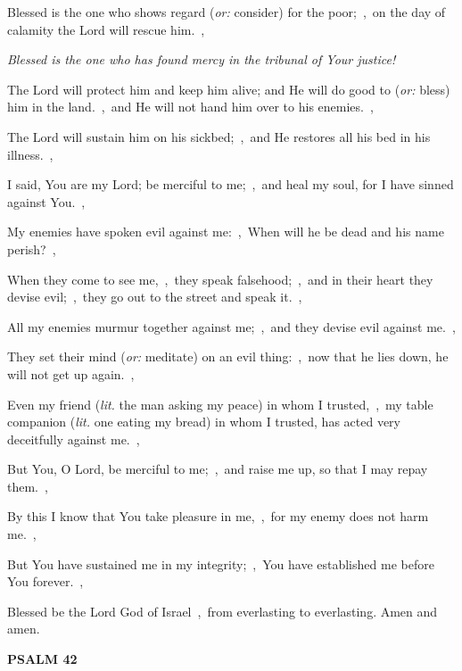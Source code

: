 \documentclass[12pt,twoside,a5paper]{article}
\newcommand{\psalm}[1]{\textbf{PSALM {#1}}\nopagebreak}
\newcommand{\qanona}[1]{{\liturgicalhint{Qanona.} \emph{#1}}}
\newcommand{\translationoption}[1]{\emph{or:} #1}
\newcommand{\translationliteral}[1]{\emph{lit.} #1}
\begin{document}
\begin{normalparskip}
  Blessed is the one who shows regard (\translationoption{consider}) for the poor;~\sep\ on the day of calamity the Lord will rescue him.~\sep

  \qanona{Blessed is the one who has found mercy in the tribunal of Your justice!}

  The Lord will protect him and keep him alive; and He will do good to (\translationoption{bless}) him in the land.~\sep\ and He will not hand him over to his enemies.~\sep

  The Lord will sustain him on his sickbed;~\sep\ and He restores all his bed in his illness.~\sep

  I said, You are my Lord; be merciful to me;~\sep\ and heal my soul, for I have sinned against You.~\sep

  My enemies have spoken evil against me:~\sep\ When will he be dead and his name perish?~\sep

  When they come to see me,~\sep\ they speak falsehood;~\sep\ and in their heart they devise evil;~\sep\ they go out to the street and speak it.~\sep

  All my enemies murmur together against me;~\sep\ and they devise evil against me.~\sep

  They set their mind (\translationoption{meditate}) on an evil thing:~\sep\ now that he lies down, he will not get up again.~\sep

  Even my friend (\translationliteral{the man asking my peace}) in whom I trusted,~\sep\ my table companion (\translationliteral{one eating my bread}) in whom I trusted, has acted very deceitfully against me.~\sep

  But You, O Lord, be merciful to me;~\sep\ and raise me up, so that I may repay them.~\sep

  By this I know that You take pleasure in me,~\sep\ for my enemy does not harm me.~\sep

  But You have sustained me in my integrity;~\sep\ You have established me before You forever.~\sep

  Blessed be the Lord God of Israel~\sep\ from everlasting to everlasting. Amen and amen.
\end{normalparskip}

\psalm{42}
\end{document}
